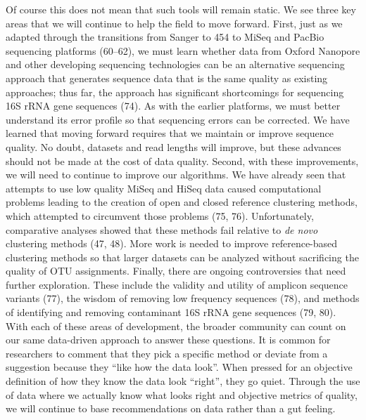 \documentclass[11pt,]{article}
\begin{document}
Of course this does not mean that such tools will remain static. We see
three key areas that we will continue to help the field to move forward.
First, just as we adapted through the transitions from Sanger to 454 to
MiSeq and PacBio sequencing platforms (60--62), we must learn whether
data from Oxford Nanopore and other developing sequencing technologies
can be an alternative sequencing approach that generates sequence data
that is the same quality as existing approaches; thus far, the approach
has significant shortcomings for sequencing 16S rRNA gene sequences
(74). As with the earlier platforms, we must better understand its error
profile so that sequencing errors can be corrected. We have learned that
moving forward requires that we maintain or improve sequence quality. No
doubt, datasets and read lengths will improve, but these advances should
not be made at the cost of data quality. Second, with these
improvements, we will need to continue to improve our algorithms. We
have already seen that attempts to use low quality MiSeq and HiSeq data
caused computational problems leading to the creation of open and closed
reference clustering methods, which attempted to circumvent those
problems (75, 76). Unfortunately, comparative analyses showed that these
methods fail relative to \emph{de novo} clustering methods (47, 48).
More work is needed to improve reference-based clustering methods so
that larger datasets can be analyzed without sacrificing the quality of
OTU assignments. Finally, there are ongoing controversies that need
further exploration. These include the validity and utility of amplicon
sequence variants (77), the wisdom of removing low frequency sequences
(78), and methods of identifying and removing contaminant 16S rRNA gene
sequences (79, 80). With each of these areas of development, the broader
community can count on our same data-driven approach to answer these
questions. It is common for researchers to comment that they pick a
specific method or deviate from a suggestion because they ``like how the
data look''. When pressed for an objective definition of how they know
the data look ``right'', they go quiet. Through the use of data where we
actually know what looks right and objective metrics of quality, we will
continue to base recommendations on data rather than a gut feeling.
\end{document}
